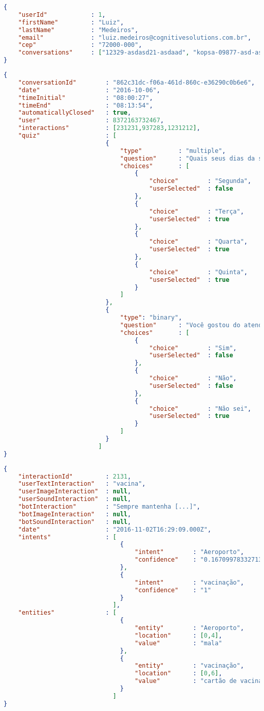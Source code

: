 
\medskip
\begin{lstlisting}[language=json, caption= Exemplo da estrutura User de dados já no formato MongoDB, label={list:UserJsonSample}]
{
	"userId" 			: 1,
	"firstName" 		: "Luiz",
	"lastName"  		: "Medeiros",
	"email"				: "luiz.medeiros@cognitivesolutions.com.br",
	"cep"				: "72000-000",
	"conversations"		: ["12329-asdasd21-asdaad", "kopsa-09877-asd-asdad"]
}
\end{lstlisting}

\medskip
\begin{lstlisting}[language=json, caption= Exemplo da estrutura Conversation de dados já no formato MongoDB, label={list:ConversationJsonSample}]
{
	"conversationId" 		: "862c31dc-f06a-461d-860c-e36290c0b6e6",
	"date"		 			: "2016-10-06",
	"timeInitial"  			: "08:00:27",
	"timeEnd"				: "08:13:54",
	"automaticallyClosed"	: true,
	"user"					: 8372163732467,
	"interactions"			: [231231,937283,1231212],
	"quiz"					: [
							{
								"type"			: "multiple",
								"question"		: "Quais seus dias da semana preferidos?",
								"choices"		: [
									{
										"choice" 		: "Segunda",
										"userSelected"	: false
									},
									{
										"choice" 		: "Terça",
										"userSelected"	: true
									},
									{
										"choice" 		: "Quarta",
										"userSelected"	: true
									},
									{
										"choice" 		: "Quinta",
										"userSelected"	: true
									}
								]
							}, 
							{
								"type": "binary",
								"question"		: "Você gostou do atendimento?",
								"choices"		: [
									{
										"choice" 		: "Sim",
										"userSelected"	: false
									},
									{
										"choice" 		: "Não",
										"userSelected"	: false
									},
									{
										"choice" 		: "Não sei",
										"userSelected"	: true
									}
								]
							}
						  ]
}

\end{lstlisting}

\newpage
\medskip
\begin{lstlisting}[language=json, caption= Exemplo da estrutura Interaction de dados já no formato MongoDB, label={list:InteractionJsonSample}]
{
	"interactionId" 		: 2131,
	"userTextInteraction" 	: "vacina",
	"userImageInteraction"	: null,
	"userSoundInteraction"	: null,
	"botInteraction"  		: "Sempre mantenha [...]",
	"botImageInteraction"	: null,
	"botSoundInteraction"	: null,
	"date"					: "2016-11-02T16:29:09.000Z",
	"intents"				: [
								{
									"intent" 		: "Aeroporto",
									"confidence"	: "0.16709978332713935"
								},
								{
									"intent" 		: "vacinação",
									"confidence"	: "1"
								}
							  ],
	"entities"				: [
								{
									"entity" 		: "Aeroporto",
									"location"		: [0,4],
									"value"			: "mala"
								},
								{
									"entity" 		: "vacinação",
									"location"		: [0,6],
									"value"			: "cartão de vacinação"
								}
							  ]
}

\end{lstlisting}